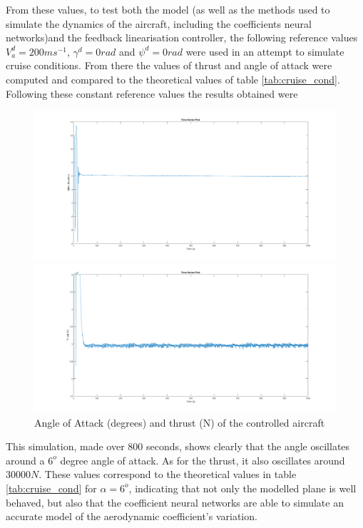 From these values, to test both the model (as well as the methods used to simulate the dynamics of the aircraft, including the coefficients neural networks)and the feedback linearisation controller, the following reference values $V_a^d=200 ms^{-1}$, $\gamma^d = 0 rad$ and $\psi^d=0 rad$ were used in an attempt to simulate cruise conditions. From there the values of thrust and angle of attack were computed and  compared to the theoretical values of table \ref{tab:cruise_cond}. 
Following these constant reference values the results obtained were

\begin{figure}
\centering
\begin{minipage}{\textwidth}
\includegraphics[width=1\textwidth]{Figures/Results/aoa_check.PNG}
\end{minipage}
\begin{minipage}{\textwidth}
\includegraphics[width=1\textwidth]{Figures/Results/thrust_check.PNG}
\end{minipage}
\caption[AoA and thrust validation]{Angle of Attack (degrees) and thrust (N) of the controlled aircraft}
\end{figure}

This simulation, made over 800 seconds, shows clearly that the angle oscillates around a $6^o$ degree angle of attack. As for the thrust, it also oscillates around $30000N$. These values correspond to the theoretical values in table \ref{tab:cruise_cond} for $\alpha=6^o$, indicating that not only the modelled plane is well behaved, but also that the coefficient neural networks are able to simulate an accurate model of the aerodynamic coefficient's variation.


